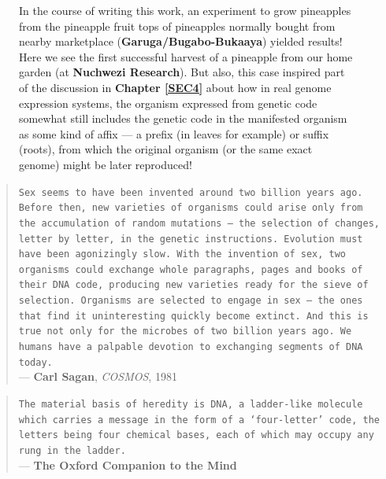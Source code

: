 \documentclass[a4paper, 18pt]{book} %
\begin{document}
\begin{figure}[H]
\begin{center}
   \caption{In the course of writing this work, an experiment to grow pineapples from the pineapple fruit tops of pineapples normally bought from nearby marketplace (\textbf{Garuga/Bugabo-Bukaaya}) yielded results! Here we see the first successful harvest of a pineapple from our home garden (at \textbf{Nuchwezi Research}). But also, this case inspired part of the discussion in \textbf{Chapter \ref{SEC4}} about how in real genome expression systems, the organism expressed from genetic code somewhat still includes the genetic code in the manifested organism as some kind of affix --- a prefix (in leaves for example) or suffix (roots), from which the original organism (or the same exact genome) might be later reproduced!}
  \label{FIGPINEAPPLE}
  \end{center}
\end{figure}

\begin{quotation}
\noindent \texttt{Sex seems to have been invented around two billion years ago. Before then, new varieties of organisms could arise only from the accumulation of random mutations --- the selection of changes, letter by letter, in the genetic instructions. Evolution must have been agonizingly slow. With the invention of sex, two organisms could exchange whole paragraphs, pages and books of their DNA code, producing new varieties ready for the sieve of selection. Organisms are selected to engage in sex --- the ones that find it uninteresting quickly become extinct. And this is true not only for the microbes of two billion years ago. We humans have a palpable devotion to exchanging segments of DNA today.}\\
\hspace*{\fill} --- \textbf{Carl Sagan}, \textit{COSMOS}, 1981\cite{sagan1981cosmos}
\end{quotation}


\begin{quotation}
\noindent \texttt{The material basis of heredity is DNA, a ladder-like molecule which carries a message in the form of a `four-letter' code, the letters being four chemical bases, each of which may occupy any rung in the ladder.}\\
\hspace*{\fill} --- \textbf{The Oxford Companion to the Mind}\cite{gregory1987oxford}
\end{quotation}
\end{document}
